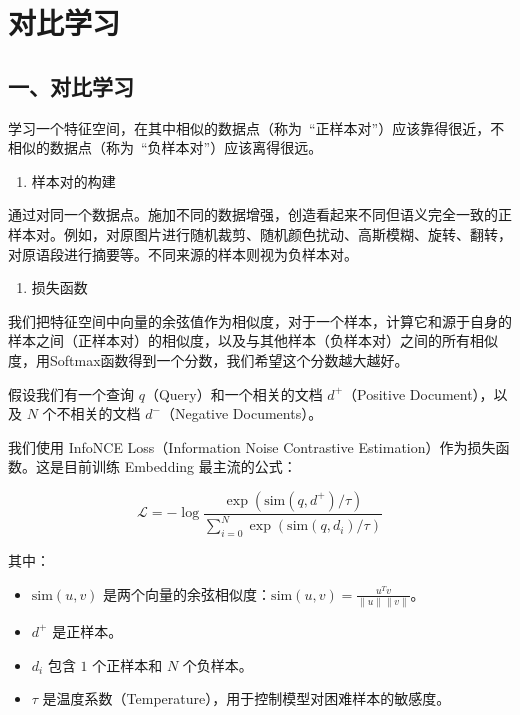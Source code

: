 \setcounter{section}{0}

\hypertarget{ux5bf9ux6bd4ux5b66ux4e60}{%
\section{对比学习}\label{ux5bf9ux6bd4ux5b66ux4e60}}

\hypertarget{ux4e00ux5bf9ux6bd4ux5b66ux4e60}{%
\subsection{一、对比学习}\label{ux4e00ux5bf9ux6bd4ux5b66ux4e60}}

学习一个特征空间，在其中相似的数据点（称为~``正样本对''）应该靠得很近，不相似的数据点（称为~``负样本对''）应该离得很远。

\begin{enumerate}
\def\labelenumi{\arabic{enumi}.}
\tightlist
\item
  样本对的构建
\end{enumerate}

通过对同一个数据点。施加不同的数据增强，创造看起来不同但语义完全一致的正样本对。例如，对原图片进行随机裁剪、随机颜色扰动、高斯模糊、旋转、翻转，对原语段进行摘要等。不同来源的样本则视为负样本对。

\begin{enumerate}
\def\labelenumi{\arabic{enumi}.}
\setcounter{enumi}{1}
\tightlist
\item
  损失函数
\end{enumerate}

我们把特征空间中向量的余弦值作为相似度，对于一个样本，计算它和源于自身的样本之间（正样本对）的相似度，以及与其他样本（负样本对）之间的所有相似度，用Softmax函数得到一个分数，我们希望这个分数越大越好。

假设我们有一个查询 \(q\)（Query）和一个相关的文档 \(d^+\)（Positive Document），以及 \(N\) 个不相关的文档 \(d^-\)（Negative Documents）。

我们使用 InfoNCE Loss（Information Noise Contrastive Estimation）作为损失函数。这是目前训练 Embedding 最主流的公式：

\[
\mathcal{L} = -\log \frac{\exp(\mathrm{sim}(q,d^+)/\tau)}{\sum_{i=0}^{N}\exp(\mathrm{sim}(q,d_i)/\tau)}
\]

其中：

\begin{itemize}
\tightlist
\item
  \(\mathrm{sim}(u,v)\) 是两个向量的余弦相似度：\(\mathrm{sim}(u,v)=\frac{u^Tv}{\lVert u\rVert\lVert v\rVert}\)。
\item
  \(d^+\) 是正样本。
\item
  \(d_i\) 包含 \(1\) 个正样本和 \(N\) 个负样本。
\item
  \(\tau\) 是温度系数（Temperature），用于控制模型对困难样本的敏感度。
\end{itemize}

